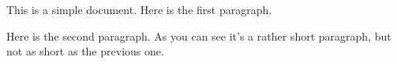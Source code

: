 \documentclass[12pt]{scrartcl}
\begin{document}
This is a simple document.
Here is the first paragraph.

Here is the second paragraph. As you
can        see it's 
a rather
short paragraph, but not as short as the previous one.
\end{document}
